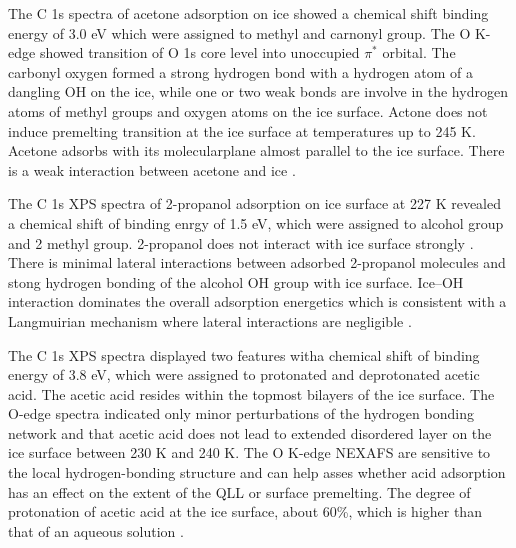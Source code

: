 \documentclass[a4paper,11pt]{report}
\begin{document}
The C 1s spectra of acetone adsorption on ice showed a chemical shift binding
energy of 3.0 eV which were assigned to methyl and carnonyl group. The 
O K-edge showed transition of O 1s core level into unoccupied $\pi^{*}$ orbital.
The carbonyl oxygen formed a strong hydrogen bond with a hydrogen atom of a dangling OH on the
ice, while one or two weak bonds are involve in the hydrogen atoms of methyl
groups and oxygen atoms on the ice surface. Actone does not induce premelting 
transition at the ice surface at temperatures up to 245 K. Acetone adsorbs with
its molecularplane almost parallel to the ice surface. There is a weak interaction 
between acetone and ice \citep{starr2011acetone}.

The C 1s XPS spectra of 2-propanol adsorption on ice surface at 227 K revealed 
a chemical  shift of binding enrgy of 1.5 eV, which were assigned to alcohol 
group and 2 methyl group. 2-propanol does not interact with ice surface strongly 
. There is minimal lateral interactions between adsorbed 2-propanol molecules and 
stong hydrogen bonding of the alcohol OH group with ice surface.
Ice–OH interaction dominates the overall adsorption energetics which is 
consistent with a Langmuirian mechanism where lateral interactions are
negligible \citep{newberg2015adsorption}.

The C 1s XPS  spectra displayed two features witha chemical shift of binding energy 
of 3.8 eV, which were assigned to protonated and deprotonated acetic acid. 
The acetic acid resides within the topmost bilayers of the ice surface. 
The O-edge spectra indicated only minor perturbations of the hydrogen bonding 
network and that acetic acid does not lead to extended disordered layer on the ice 
surface between 230 K and 240 K. The O K-edge NEXAFS are sensitive to the local 
hydrogen-bonding structure and can help asses whether acid adsorption has an 
effect on the extent of the QLL or surface premelting. The degree of protonation
of acetic acid at the ice surface, about 60\%, which is higher than that
of an aqueous solution \citep{krepelova2013adsorption}.
\end{document}
